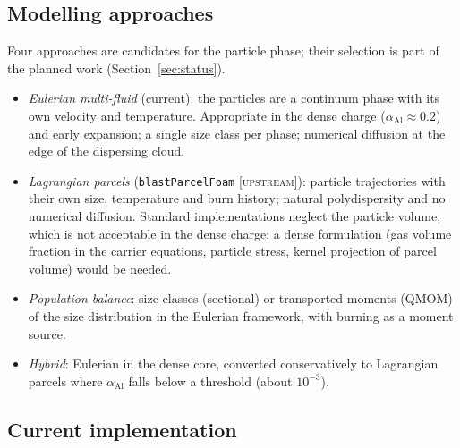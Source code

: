 \documentclass{article}
\newcommand{\up}{\textsc{[upstream]}}
\begin{document}
\subsection{Modelling approaches}
\label{sec:al_approaches}

Four approaches are candidates for the particle phase; their selection is part of the planned work (Section~\ref{sec:status}).
\begin{itemize}
    \item \emph{Eulerian multi-fluid} (current): the particles are a continuum phase with its own velocity and temperature. Appropriate in the dense charge ($\alpha_\text{Al} \approx 0.2$) and early expansion; a single size class per phase; numerical diffusion at the edge of the dispersing cloud.
    \item \emph{Lagrangian parcels} (\texttt{blastParcelFoam} \up): particle trajectories with their own size, temperature and burn history; natural polydispersity and no numerical diffusion. Standard implementations neglect the particle volume, which is not acceptable in the dense charge; a dense formulation (gas volume fraction in the carrier equations, particle stress, kernel projection of parcel volume) would be needed.
    \item \emph{Population balance}: size classes (sectional) or transported moments (QMOM) of the size distribution in the Eulerian framework, with burning as a moment source.
    \item \emph{Hybrid}: Eulerian in the dense core, converted conservatively to Lagrangian parcels where $\alpha_\text{Al}$ falls below a threshold (about $10^{-3}$).
\end{itemize}

\subsection{Current implementation}
\label{sec:al_impl}
\end{document}
